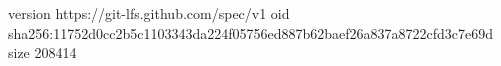 version https://git-lfs.github.com/spec/v1
oid sha256:11752d0cc2b5c1103343da224f05756ed887b62baef26a837a8722cfd3c7e69d
size 208414
